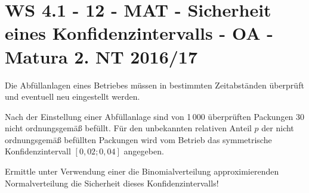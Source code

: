 \section{WS 4.1 - 12 - MAT - Sicherheit eines Konfidenzintervalls - OA - Matura 2. NT 2016/17}

\begin{beispiel}[WS 4.1]{1} %
Die Abfüllanlagen eines Betriebes müssen in bestimmten Zeitabständen überprüft und eventuell neu eingestellt werden.

Nach der Einstellung einer Abfüllanlage sind von 1\,000 überprüften Packungen 30 nicht ordnungsgemäß befüllt. Für den unbekannten relativen Anteil $p$ der nicht ordnungsgemäß befüllten Packungen wird vom Betrieb das symmetrische Konfidenzintervall $[0,02; 0,04]$ angegeben.

Ermittle unter Verwendung einer die Binomialverteilung approximierenden Normalverteilung die Sicherheit dieses Konfidenzintervalls!\leer

\end{beispiel}